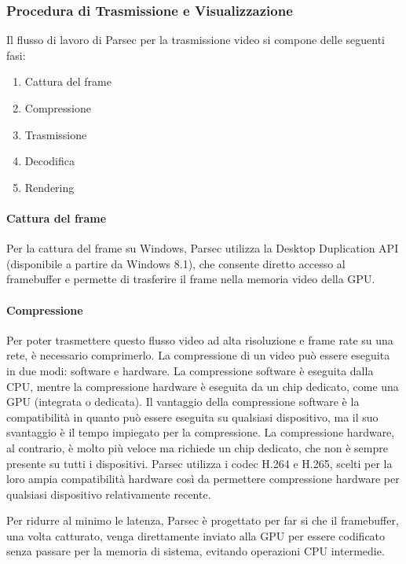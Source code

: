 \documentclass[12pt,a4paper,openright,twoside]{book}
\begin{document}
\subsubsection{Procedura di Trasmissione e Visualizzazione}

Il flusso di lavoro di Parsec per la trasmissione video si compone delle seguenti fasi:
\begin{enumerate}
    \item Cattura del frame
    \item Compressione
    \item Trasmissione
    \item Decodifica
    \item Rendering
\end{enumerate}

\paragraph{Cattura del frame}
Per la cattura del frame su Windows, Parsec utilizza la Desktop Duplication API (disponibile a partire da Windows 8.1),
che consente diretto accesso al framebuffer e permette di trasferire il frame nella memoria video della GPU.

\paragraph{Compressione}
Per poter trasmettere questo flusso video ad alta risoluzione e frame rate su una rete, è necessario comprimerlo.
La compressione di un video può essere eseguita in due modi: software e hardware.
%
La compressione software è eseguita dalla CPU, mentre la compressione hardware è eseguita da un chip dedicato, come una GPU (integrata o dedicata).
%
Il vantaggio della compressione software è la compatibilità in quanto può essere eseguita su qualsiasi dispositivo, ma il suo svantaggio è il tempo impiegato per la compressione.
La compressione hardware, al contrario, è molto più veloce ma richiede un chip dedicato, che non è sempre presente su tutti i dispositivi.
%
Parsec utilizza i codec H.264 e H.265, scelti per la loro ampia compatibilità hardware così da permettere compressione hardware per qualsiasi dispositivo relativamente recente.

Per ridurre al minimo le latenza, Parsec è progettato per far si che il framebuffer,
una volta catturato, venga direttamente inviato alla GPU per essere codificato senza passare per la memoria di sistema, evitando operazioni CPU intermedie.
\end{document}
